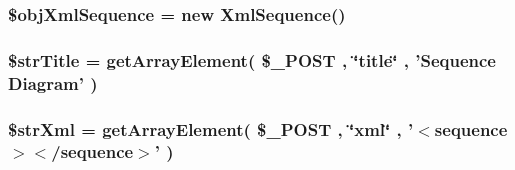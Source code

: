\hypertarget{sequence_8php_eefa469c1b13fe1fec040c910b720034}{
\subsubsection[{\$objXmlSequence}]{\setlength{\rightskip}{0pt plus 5cm}\$objXmlSequence = new {\bf XmlSequence}()}}
\label{sequence_8php_eefa469c1b13fe1fec040c910b720034}


\hypertarget{sequence_8php_e5059171a0a3647786809cd168a41c0f}{
\subsubsection[{\$strTitle}]{\setlength{\rightskip}{0pt plus 5cm}\$strTitle = getArrayElement( \$\_\-POST , \char`\"{}title\char`\"{} , 'Sequence Diagram' )}}
\label{sequence_8php_e5059171a0a3647786809cd168a41c0f}


\hypertarget{sequence_8php_2651e3074f6303e4683f2aff16ec1fbd}{
\subsubsection[{\$strXml}]{\setlength{\rightskip}{0pt plus 5cm}\$strXml = getArrayElement( \$\_\-POST , \char`\"{}xml\char`\"{} , '$<$sequence$>$$<$/sequence$>$' )}}
\label{sequence_8php_2651e3074f6303e4683f2aff16ec1fbd}


